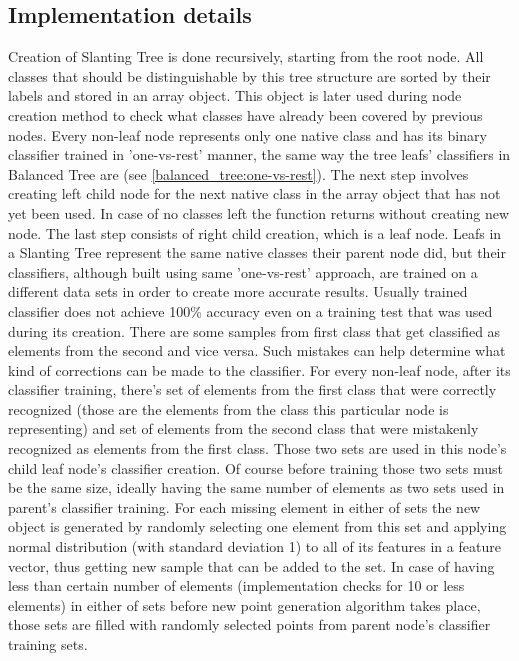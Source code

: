 \subsection{Implementation details}

\label{slanting_tree_implementation}Creation of Slanting Tree is done recursively, starting from the root node. All classes that should be distinguishable by this tree structure are sorted by their labels and stored in an array object. This object is later used during node creation method to check what classes have already been covered by previous nodes. Every non-leaf node represents only one native class and has its binary classifier trained in 'one-vs-rest' manner, the same way the tree leafs' classifiers in Balanced Tree are (see \ref{balanced_tree:one-vs-rest}). The next step involves creating left child node for the next native class in the array object that has not yet been used. In case of no classes left the function returns without creating new node. The last step consists of right child creation, which is a leaf node. Leafs in a Slanting Tree represent the same native classes their parent node did, but their classifiers, although built using same 'one-vs-rest' approach, are trained on a different data sets in order to create more accurate results. Usually trained classifier does not achieve 100\% accuracy even on a training test that was used during its creation. There are some samples from first class that get classified as elements from the second and vice versa. Such mistakes can help determine what kind of corrections can be made to the classifier. For every non-leaf node, after its classifier training, there's set of elements from the first class that were correctly recognized (those are the elements from the class this particular node is representing) and set of elements from the second class that were mistakenly recognized as elements from the first class. Those two sets are used in this node's child leaf node's classifier creation. Of course before training those two sets must be the same size, ideally having the same number of elements as two sets used in parent's classifier training. For each missing element in either of sets the new object is generated by randomly selecting one element from this set and applying normal distribution (with standard deviation 1) to all of its features in a feature vector, thus getting new sample that can be added to the set. In case of having less than certain number of elements (implementation checks for 10 or less elements) in either of sets before new point generation algorithm takes place, those sets are filled with randomly selected points from parent node's classifier training sets.

